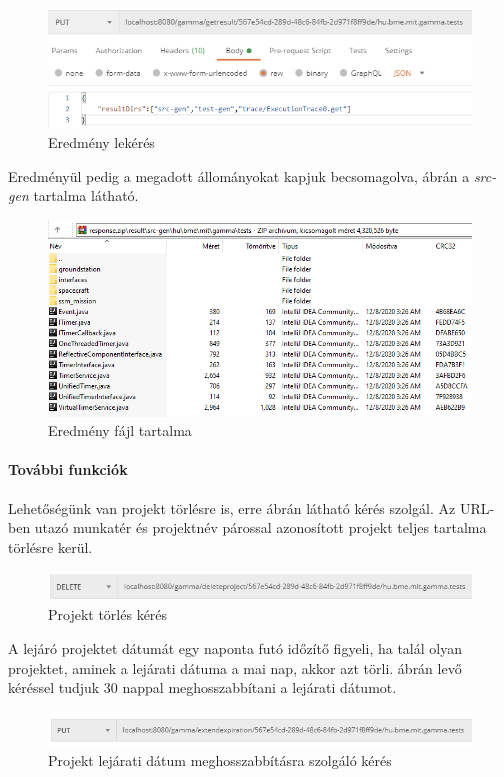 \begin{figure}[!ht]
	\includegraphics[width=150mm, keepaspectratio]{figures/get_result_request.PNG}
	\caption{Eredmény lekérés}
	\label{fig:get_result_request}
\end{figure}

Eredményül pedig a megadott állományokat kapjuk becsomagolva,  ábrán a \textit{src-gen} tartalma látható. 

\begin{figure}[!ht]
	\includegraphics[width=150mm, keepaspectratio]{figures/result_zip.PNG}
	\caption{Eredmény fájl tartalma}
	\label{fig:result_zip}
\end{figure}
\paragraph{További funkciók} Lehetőségünk van projekt törlésre is, erre  ábrán látható kérés szolgál. Az URL-ben utazó munkatér és projektnév párossal azonosított projekt teljes tartalma törlésre kerül.


\begin{figure}[!ht]
	\includegraphics[width=\textwidth, keepaspectratio]{figures/delete_project_request.PNG}
	\caption{Projekt törlés kérés}
	\label{fig:delete_project_request}
\end{figure}

A lejáró projektet dátumát egy naponta futó időzítő figyeli, ha talál olyan projektet, aminek a lejárati dátuma a mai nap, akkor azt törli.  ábrán levő kéréssel tudjuk 30 nappal meghosszabbítani a lejárati dátumot.

\begin{figure}[!ht]
	\includegraphics[width=\textwidth, keepaspectratio]{figures/extend_expiration_req.PNG}
	\caption{Projekt lejárati dátum meghosszabbításra szolgáló kérés}
	\label{fig:extend_expiration_req}
\end{figure}